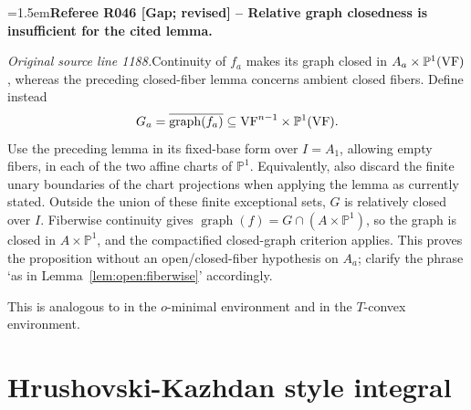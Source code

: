 \documentclass[12pt]{amsart}
\newcommand{\RefereeRemark}[4]{%
  \par\medskip\begingroup\normalfont\small\color{RefereePurple}%
  \emergencystretch=1.5em\noindent\textbf{Referee R#1 [#2] -- #3.}\par\nobreak\noindent #4\par
  \endgroup\medskip
}
\theoremstyle{plain}
\theoremstyle{definition}
\theoremstyle{remark}
\numberwithin{equation}{section}
\theoremstyle{plain}
\newcommand{\VF}{\textup{VF}}
\newcommand{\omin}{$o$\nobreakdash}
\newcommand{\T}{$T$\nobreakdash}
\newcommand{\0}{\emptyset}
\begin{document}
\RefereeRemark{046}{Gap; revised}{Relative graph closedness is insufficient for the cited lemma}{%
\textit{Original source line 1188.}\quad Continuity of $f_a$ makes its graph closed in $A_a\times\mathbb P^1(\VF)$, whereas the preceding closed-fiber lemma concerns ambient closed fibers. Define instead
\[
 G_a=\overline{\operatorname{graph}(f_a)}\subseteq\VF^{n-1}\times\mathbb P^1(\VF).
\]
Use the preceding lemma in its fixed-base form over $I=A_1$, allowing empty fibers, in each of the two affine charts of $\mathbb P^1$. Equivalently, also discard the finite unary boundaries of the chart projections when applying the lemma as currently stated. Outside the union of these finite exceptional sets, $G$ is relatively closed over $I$. Fiberwise continuity gives $\operatorname{graph}(f)=G\cap(A\times\mathbb P^1)$, so the graph is closed in $A\times\mathbb P^1$, and the compactified closed-graph criterion applies. This proves the proposition without an open/closed-fiber hypothesis on $A_a$; clarify the phrase `as in Lemma~\ref{lem:open:fiberwise}' accordingly.
}

This is analogous to \cite[Corollary~6.2.4]{dries:1998} in the \omin-minimal environment and \cite[Lemma~2.38]{Yin:tcon:1.5} in the \T-convex environment.


\section{Hrushovski-Kazhdan style integral}\label{sec:HK:main}
\end{document}
